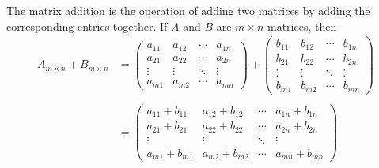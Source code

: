\documentclass{subfile}
\begin{document}
	\begin{definition}
		The matrix addition is the operation of adding two matrices by adding the corresponding entries together. If $A$ and $B$ are $m \times n$ matrices, then
		\begin{align*}
	{A_{m \times n}} + {B_{m \times n}} &= \begin{pmatrix}
		{{a_{11}}}&{{a_{12}}}& \cdots &{{a_{1n}}}\\
		{{a_{21}}}&{{a_{22}}}& \cdots &{{a_{2n}}}\\
		\vdots & \vdots & \ddots & \vdots \\
		{{a_{m1}}}&{{a_{m2}}}& \cdots &{{a_{mn}}}
		\end{pmatrix} + \begin{pmatrix}
		{{b_{11}}}&{{b_{12}}}& \cdots &{{b_{1n}}}\\
		{{b_{21}}}&{{b_{22}}}& \cdots &{{b_{2n}}}\\
		\vdots & \vdots & \ddots & \vdots \\
		{{b_{m1}}}&{{b_{m2}}}& \cdots &{{b_{mn}}}
		\end{pmatrix}\\
	\\
	&= \begin{pmatrix}
		{{a_{11}} + {b_{11}}}&{{a_{12}} + {b_{12}}}& \cdots &{{a_{1n}} + {b_{1n}}}\\
		{{a_{21}} + {b_{21}}}&{{a_{22}} + {b_{22}}}& \cdots &{{a_{2n}} + {b_{2n}}}\\
		\vdots & \vdots & \ddots & \vdots \\
		{{a_{m1}} + {b_{m1}}}&{{a_{m2}} + {b_{m2}}}& \cdots &{{a_{mn}} + {b_{mn}}}
		\end{pmatrix}
		\end{align*}


	\end{definition}


\end{document}
